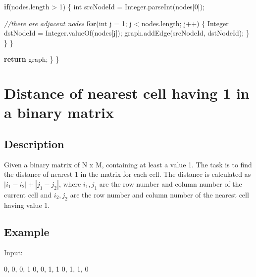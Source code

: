 \documentclass[]{book}
\newenvironment{Shaded}{\begin{snugshade}}{\end{snugshade}}
\newcommand{\BuiltInTok}[1]{#1}
\newcommand{\CommentTok}[1]{\textcolor[rgb]{0.56,0.35,0.01}{\textit{#1}}}
\newcommand{\DataTypeTok}[1]{\textcolor[rgb]{0.13,0.29,0.53}{#1}}
\newcommand{\DecValTok}[1]{\textcolor[rgb]{0.00,0.00,0.81}{#1}}
\newcommand{\FunctionTok}[1]{\textcolor[rgb]{0.00,0.00,0.00}{#1}}
\newcommand{\KeywordTok}[1]{\textcolor[rgb]{0.13,0.29,0.53}{\textbf{#1}}}
\newcommand{\NormalTok}[1]{#1}
\begin{document}
\begin{Shaded}
\begin{Highlighting}[]
            \KeywordTok{if}\NormalTok{(nodes.}\FunctionTok{length}\NormalTok{ > }\DecValTok{1}\NormalTok{) \{}
                \DataTypeTok{int}\NormalTok{ srcNodeId = }\BuiltInTok{Integer}\NormalTok{.}\FunctionTok{parseInt}\NormalTok{(nodes[}\DecValTok{0}\NormalTok{]);}

                \CommentTok{//there are adjacent nodes}
                \KeywordTok{for}\NormalTok{(}\DataTypeTok{int}\NormalTok{ j = }\DecValTok{1}\NormalTok{; j < nodes.}\FunctionTok{length}\NormalTok{; j++) \{}
                    \BuiltInTok{Integer}\NormalTok{ dstNodeId = }\BuiltInTok{Integer}\NormalTok{.}\FunctionTok{valueOf}\NormalTok{(nodes[j]);}
\NormalTok{                    graph.}\FunctionTok{addEdge}\NormalTok{(srcNodeId, dstNodeId);}
\NormalTok{                \}}
\NormalTok{            \}}
\NormalTok{        \}}

        \KeywordTok{return}\NormalTok{ graph;}
\NormalTok{    \}}
\NormalTok{\}}
\end{Highlighting}
\end{Shaded}

\hypertarget{distance-of-nearest-cell-having-1-in-a-binary-matrix}{%
\section{Distance of nearest cell having 1 in a binary matrix}\label{distance-of-nearest-cell-having-1-in-a-binary-matrix}}

\hypertarget{description-81}{%
\subsection{Description}\label{description-81}}

Given a binary matrix of N x M, containing at least a value 1. The task is to find the distance of nearest 1 in the
matrix for each cell. The distance is calculated as \(|i_1 - i_2| + |j_1 - j_2|\), where \(i_1, j_1\) are the row number
and column number of the current cell and \(i_2, j_2\) are the row number and column number of the nearest cell having
value 1.

\hypertarget{example-77}{%
\subsection{Example}\label{example-77}}

Input:

\begin{Shaded}
\begin{Highlighting}[]
\DecValTok{0}\NormalTok{, }\DecValTok{0}\NormalTok{, }\DecValTok{0}\NormalTok{, }\DecValTok{1}
\DecValTok{0}\NormalTok{, }\DecValTok{0}\NormalTok{, }\DecValTok{1}\NormalTok{, }\DecValTok{1}
\DecValTok{0}\NormalTok{, }\DecValTok{1}\NormalTok{, }\DecValTok{1}\NormalTok{, }\DecValTok{0}
\end{Highlighting}
\end{Shaded}
\end{document}
